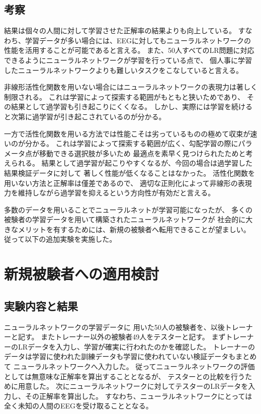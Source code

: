 \subsection{\mc 考察}
結果は個々の人間に対して学習させた正解率の結果よりも向上している。
すなわち、学習データが多い場合には、EEGに対してもニューラルネットワークの性能を活用することが可能であると言える。
また、50人すべてのLR問題に対応できるようにニューラルネットワークが学習を行っている点で、
個人事に学習したニューラルネットワークよりも難しいタスクをこなしていると言える。

非線形活性化関数を用いない場合にはニューラルネットワークの表現力は著しく制限される。
これは学習によって探索する範囲がもともと狭いためであり、
その結果として過学習も引き起こりにくくなる。
しかし、実際には学習を続けると次第に過学習が引き起こされているのが分かる。

一方で活性化関数を用いる方法では性能こそは劣っているものの極めて収束が速いのが分かる。
これは学習によって探索する範囲が広く、勾配学習の際にパラメータ点が移動できる選択肢が多いため
最適点を素早く見つけられたためと考えられる。
結果として過学習が起こりやすくなるが、今回の場合は過学習した結果検証データに対して
著しく性能が低くなることはなかった。
活性化関数を用いない方法と正解率は僅差であるので、
適切な正則化によって非線形の表現力を維持しながら過学習を抑えるという方向性が有効だと言える。

多数のデータを用いることでニューラルネットが学習可能になったが、
多くの被験者の学習データを用いて構築されたニューラルネットワークが
社会的に大きなメリットを有するためには、新規の被験者へ転用できることが望ましい。
従って以下の追加実験を実施した。

\section{\mc 新規被験者への適用検討}
\subsection{\mc 実験内容と結果}
ニューラルネットワークの学習データに
用いた50人の被験者を、以後トレーナーと記す。
またトレーナー以外の被験者49人をテスターと記す。
まずトレーナーのLRデータを入力し、学習が確実に行われたのかを確認した。
トレーナーのデータは学習に使われた訓練データも学習に使われていない検証データもまとめて
ニューラルネットワークへ入力した。
従ってニューラルネットワークの評価としては無意味な正解率を算出することとなるが、
テスターとの比較を行うために用意した。
次にニューラルネットワークに対してテスターのLRデータを入力し、その正解率を算出した。
すなわち、ニューラルネットワークにとっては全く未知の人間のEEGを受け取ることとなる。

